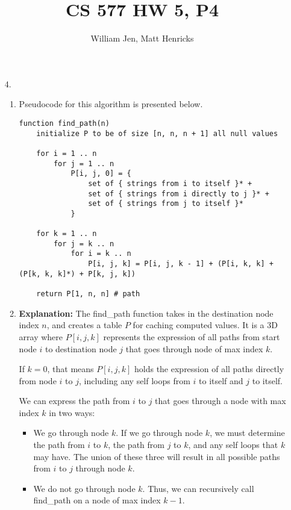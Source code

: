 \documentclass{article}
\title{CS 577 HW 5, P4}
\author{William Jen, Matt Henricks}
\date{}
\begin{document}
\maketitle

\begin{enumerate}
    \item[4.] 
        \begin{enumerate}
            \item Pseudocode for this algorithm is presented below. 
                \begin{verbatim}
function find_path(n)
    initialize P to be of size [n, n, n + 1] all null values
    
    for i = 1 .. n
        for j = 1 .. n
            P[i, j, 0] = {
                set of { strings from i to itself }* + 
                set of { strings from i directly to j }* +
                set of { strings from j to itself }*
            }
    
    for k = 1 .. n
        for j = k .. n
            for i = k .. n
                P[i, j, k] = P[i, j, k - 1] + (P[i, k, k] + (P[k, k, k]*) + P[k, j, k])
                
    return P[1, n, n] # path     
                \end{verbatim}

            \item \textbf{Explanation:}
                The find\_path function takes in the destination node index $n$, and creates a table
                $P$ for caching computed values. It is a 3D array where $P\left[i, j, k\right]$ represents
                the expression of all paths from start node $i$ to destination node $j$ that goes through
                node of max index $k$. 
                
                If $k = 0$, that means $P\left[i, j, k\right]$ holds the expression of all paths
                directly from node $i$ to $j$, including any self loops from $i$ to itself and $j$ to itself.
                
                We can express the path from $i$ to $j$ that goes through a node with max index $k$ in two ways:
                    \begin{itemize}
                        \item We go through node $k$. If we go through node $k$, we must determine the path
                            from $i$ to $k$, the path from $j$ to $k$, and any self loops that $k$ may have. 
                            The union of these three will result in all possible paths from $i$ to $j$ through
                            node $k$.
                        \item We do not go through node $k$. Thus, we can recursively call find\_path on a 
                            node of max index $k - 1$.
                    \end{itemize}
                

\end{enumerate}
\end{enumerate}
\end{document}
